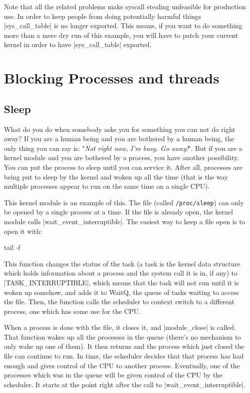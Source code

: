 \documentclass[10pt, oneside]{book}
\begin{document}
Note that all the related problems make syscall stealing unfeasible for production use.
In order to keep people from doing potentially harmful things \cpp|sys_call_table| is no longer exported.
This means, if you want to do something more than a mere dry run of this example, you will have to patch your current kernel in order to have \cpp|sys_call_table| exported.


\section{Blocking Processes and threads}
\label{sec:blocking_process_thread}
\subsection{Sleep}
\label{sec:sleep}
What do you do when somebody asks you for something you can not do right away?
If you are a human being and you are bothered by a human being, the only thing you can say is: "\emph{Not right now, I'm busy. Go away!}".
But if you are a kernel module and you are bothered by a process, you have another possibility.
You can put the process to sleep until you can service it.
After all, processes are being put to sleep by the kernel and woken up all the time (that is the way multiple processes appear to run on the same time on a single CPU).

This kernel module is an example of this.
The file (called \verb|/proc/sleep|) can only be opened by a single process at a time.
If the file is already open, the kernel module calls \cpp|wait_event_interruptible|.
The easiest way to keep a file open is to open it with:

\begin{codebash}
tail -f
\end{codebash}

This function changes the status of the task (a task is the kernel data structure which holds information about a process and the system call it is in,
if any) to \cpp|TASK_INTERRUPTIBLE|, which means that the task will not run until it is woken up somehow, and adds it to WaitQ, the queue of tasks waiting to access the file.
Then, the function calls the scheduler to context switch to a different process, one which has some use for the CPU.

When a process is done with the file, it closes it, and \cpp|module_close| is called.
That function wakes up all the processes in the queue (there's no mechanism to only wake up one of them).
It then returns and the process which just closed the file can continue to run.
In time, the scheduler decides that that process has had enough and gives control of the CPU to another process.
Eventually, one of the processes which was in the queue will be given control of the CPU by the scheduler.
It starts at the point right after the call to \cpp|wait_event_interruptible|.
\end{document}
